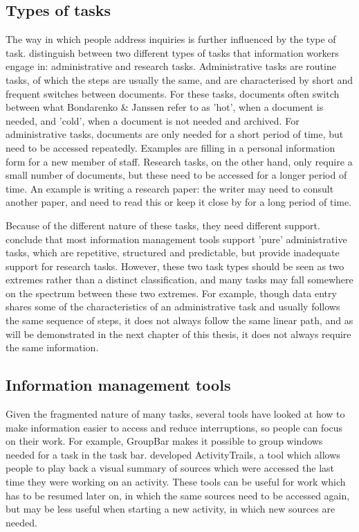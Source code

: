 \subsection{Types of tasks}
The way in which people address inquiries is further influenced by the type of task. \citet{Bondarenko2005} distinguish between two different types of tasks that information workers engage in: administrative and research tasks. Administrative tasks are routine tasks, of which the steps are usually the same, and are characterised by short and frequent switches between documents. For these tasks, documents often switch between what Bondarenko \& Janssen refer to as 'hot', when a document is needed, and 'cold', when a document is not needed and archived. For administrative tasks, documents are only needed for a short period of time, but need to be accessed repeatedly. Examples are filling in a personal information form for a new member of staff. Research tasks, on the other hand, only require a small number of documents, but these need to be accessed for a longer period of time. An example is writing a research paper: the writer may need to consult another paper, and need to read this or keep it close by for a long period of time.

Because of the different nature of these tasks, they need different support. \citet{Bondarenko2005} conclude that most information management tools support 'pure' administrative tasks, which are repetitive, structured and predictable, but provide inadequate support for research tasks. However, these two task types should be seen as two extremes rather than a distinct classification, and many tasks may fall somewhere on the spectrum between these two extremes. For example, though data entry shares some of the characteristics of an administrative task and usually follows the same sequence of steps, it does not always follow the same linear path, and as will be demonstrated in the next chapter of this thesis, it does not always require the same information. 


\subsection{Information management tools}
Given the fragmented nature of many tasks, several tools have looked at how to make information easier to access and reduce interruptions, so people can focus on their work. For example, GroupBar \citep{Smith2003} makes it possible to group windows needed for a task in the task bar. \citet{Cangiano2009} developed ActivityTrails, a tool which allows people to play back a visual summary of sources which were accessed the last time they were working on an activity.  These tools can be useful for work which has to be resumed later on, in which the same sources need to be accessed again, but may be less useful when starting a new activity, in which new sources are needed.

